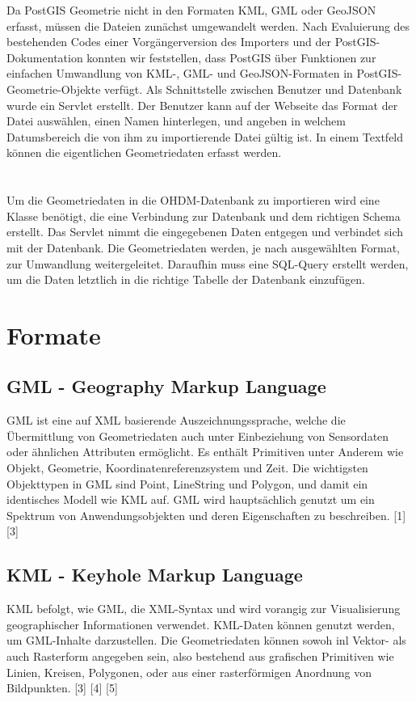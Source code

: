 \documentclass[]{article}
\begin{document}
Da PostGIS Geometrie nicht in den Formaten KML, GML oder GeoJSON erfasst, müssen die Dateien zunächst umgewandelt werden. Nach Evaluierung des bestehenden Codes einer Vorgängerversion des Importers und der PostGIS-Dokumentation konnten wir feststellen, dass PostGIS über Funktionen zur einfachen Umwandlung von KML-, GML- und GeoJSON-Formaten in PostGIS-Geometrie-Objekte verfügt. Als Schnittstelle zwischen Benutzer und Datenbank wurde ein Servlet erstellt. Der Benutzer kann auf der Webseite das Format der Datei auswählen, einen Namen hinterlegen, und angeben in welchem Datumsbereich die von ihm zu importierende Datei gültig ist. In einem Textfeld können die eigentlichen Geometriedaten erfasst werden.\\
\\
\\
Um die Geometriedaten in die OHDM-Datenbank zu importieren wird eine Klasse benötigt, die eine Verbindung zur Datenbank und dem richtigen Schema erstellt. Das Servlet nimmt die eingegebenen Daten entgegen und verbindet sich mit der Datenbank. Die Geometriedaten werden, je nach ausgewählten Format, zur Umwandlung weitergeleitet. Daraufhin muss eine SQL-Query erstellt werden, um die Daten letztlich in die richtige Tabelle der Datenbank einzufügen.

\section{Formate}
\subsection{GML - Geography Markup Language}
GML ist eine auf XML basierende Auszeichnungssprache, welche die Übermittlung von Geometriedaten auch unter Einbeziehung von Sensordaten oder ähnlichen Attributen ermöglicht. Es enthält Primitiven unter Anderem wie Objekt, Geometrie, Koordinatenreferenzsystem und Zeit. Die wichtigsten Objekttypen in GML sind Point, LineString und Polygon, und damit ein identisches Modell wie KML auf. GML wird hauptsächlich genutzt um ein Spektrum von Anwendungsobjekten und deren Eigenschaften zu beschreiben. [1] [3]

\subsection{KML - Keyhole Markup Language}
KML befolgt, wie GML, die XML-Syntax und wird vorangig zur Visualisierung geographischer Informationen verwendet. KML-Daten können genutzt werden, um GML-Inhalte darzustellen. Die Geometriedaten können sowoh inl Vektor- als auch Rasterform angegeben sein, also bestehend aus grafischen Primitiven wie Linien, Kreisen, Polygonen, oder aus einer rasterförmigen Anordnung von Bildpunkten. [3] [4] [5]
\end{document}
